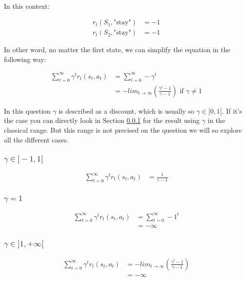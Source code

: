 
\paragraph{}
In this context:

\begin{align*}
    r_t(S_1, \text{"stay"}) &= -1\\
    r_t(S_2, \text{"stay"}) &= -1
\end{align*}

In other word, no matter the first state, we can simplify the equation in the following way:

\begin{align*}
    \sum^\infty_{t=0} \gamma^t r_t(s_t, a_t) &= \sum^\infty_{t=0} - \gamma^t\\
    &= - lim_{t \rightarrow \infty} \left( \frac{\gamma^t - 1}{\gamma - 1} \right) \text{ if } \gamma \neq 1
\end{align*}

In this question $\gamma$ is described as a discount, which is usually so $\gamma \in [0, 1[$.
If it's the case you can directly look in Section \ref{q1.1res} for the result using $\gamma$ in the classical range.
But this range is not precised on the question we will so explore all the different cases.

\subsubsection{$\gamma \in ]-1, 1[$} \label{q1.1res}

\begin{align*}
    \sum^\infty_{t=0} \gamma^t r_t(s_t, a_t) &= \frac{1}{\gamma - 1}
\end{align*}

\subsubsection{$\gamma = 1$}

\begin{align*}
    \sum^\infty_{t=0} \gamma^t r_t(s_t, a_t) &= \sum^\infty_{t=0} - 1^t\\
    &= - \infty
\end{align*}

\subsubsection{$\gamma \in ]1, +\infty[ $}

\begin{align*}
    \sum^\infty_{t=0} \gamma^t r_t(s_t, a_t)
    &= -lim_{t \rightarrow \infty} \left( \frac{\gamma^t - 1}{\gamma - 1} \right)\\
    &= - \infty
\end{align*}


